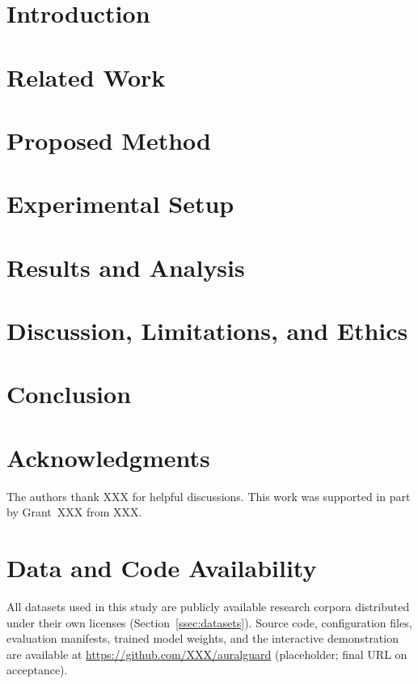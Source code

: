 \documentclass[journal]{IEEEtran}
\begin{document}
\section{Introduction}
\label{sec:intro}


\section{Related Work}
\label{sec:related}


\section{Proposed Method}
\label{sec:method}


\section{Experimental Setup}
\label{sec:setup}


\section{Results and Analysis}
\label{sec:results}


\section{Discussion, Limitations, and Ethics}
\label{sec:discussion}


\section{Conclusion}
\label{sec:conclusion}


\section*{Acknowledgments}
The authors thank XXX for helpful discussions. This work was supported in part by
Grant~XXX from XXX.

\section*{Data and Code Availability}
All datasets used in this study are publicly available research corpora distributed
under their own licenses (Section~\ref{ssec:datasets}). Source code, configuration
files, evaluation manifests, trained model weights, and the interactive demonstration
are available at \url{https://github.com/XXX/auralguard} (placeholder; final URL on
acceptance).
\end{document}
